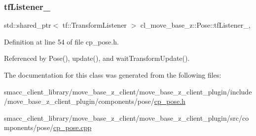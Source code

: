 \mbox{\label{classcl__move__base__z_1_1Pose_a188a5ac62d5424c1eacd667868049962}} 
\subsubsection{\texorpdfstring{tf\+Listener\+\_\+}{tfListener\_}}
{\footnotesize\ttfamily std\+::shared\+\_\+ptr$<$ tf\+::\+Transform\+Listener $>$ cl\+\_\+move\+\_\+base\+\_\+z\+::\+Pose\+::tf\+Listener\+\_\+\hspace{0.3cm}{\ttfamily [static]}, {\ttfamily [private]}}



Definition at line 54 of file cp\+\_\+pose.\+h.



Referenced by Pose(), update(), and wait\+Transform\+Update().



The documentation for this class was generated from the following files\+:\begin{DoxyCompactItemize}
\item 
smacc\+\_\+client\+\_\+library/move\+\_\+base\+\_\+z\+\_\+client/move\+\_\+base\+\_\+z\+\_\+client\+\_\+plugin/include/move\+\_\+base\+\_\+z\+\_\+client\+\_\+plugin/components/pose/\hyperlink{cp__pose_8h}{cp\+\_\+pose.\+h}\item 
smacc\+\_\+client\+\_\+library/move\+\_\+base\+\_\+z\+\_\+client/move\+\_\+base\+\_\+z\+\_\+client\+\_\+plugin/src/components/pose/\hyperlink{cp__pose_8cpp}{cp\+\_\+pose.\+cpp}\end{DoxyCompactItemize}
